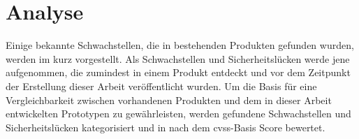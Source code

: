 \section{Analyse}
\label{sec:analysis}
	Einige bekannte Schwachstellen, die in bestehenden Produkten gefunden wurden, werden im  kurz vorgestellt. 
	Als Schwachstellen und Sicherheitslücken werde jene aufgenommen, die zumindest in einem Produkt entdeckt und vor dem Zeitpunkt der Erstellung dieser Arbeit veröffentlicht wurden. 
	Um die Basis für eine Vergleichbarkeit zwischen vorhandenen Produkten und dem in dieser Arbeit entwickelten Prototypen zu gewährleisten, werden gefundene Schwachstellen und Sicherheitslücken kategorisiert und in  nach dem \gls{cvss}-Basis Score bewertet.
